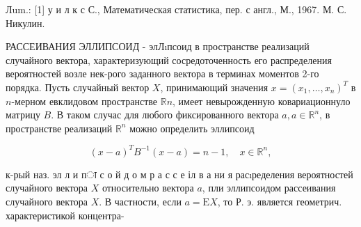 \documentclass[10pt]{article}
\begin{document}
Лum.: [1] у и л к с С., Математическая статистика, пер. с англ., М., 1967. М. С. Никулин.



РАССЕИВАНИЯ ЭЛЛИПСОИД - элЛıпсоид в пространстве реализаций случайного вектора, характеризующий сосредоточенность его распределения вероятностей возле нек-рого заданного вектора в терминах моментов 2-го порядка. Пусть случайный вектор $X$, принимающий значения $x=\left(x_{1}, \ldots, x_{n}\right)^{T}$ в $n$-мерном евклидовом пространстве $\mathbb{R} n$, имеет невырожденную ковариационнуло матрицу $B$. В таком случас для любого фиксированного вектора $a, a \in \mathbb{R}^{n}$, в пространстве реализаций $\mathbb{R}^{n}$ можно определить эллипсоид



\[

(x-a)^{T} B^{-1}(x-a)=n-1, \quad x \in \mathbb{R}^{n},

\]



к-рый наз. эл л и пा с о й д о м р а с с е іл в а ни я расıределения вероятностей случайного вектора $X$ относительно вектора $a$, пли эллипсоидом рассеивания случайного вектора $X$. В частности, если $a=\mathrm{E} X$, то Р. э. является геометрич. характеристикой концентра-
\end{document}
